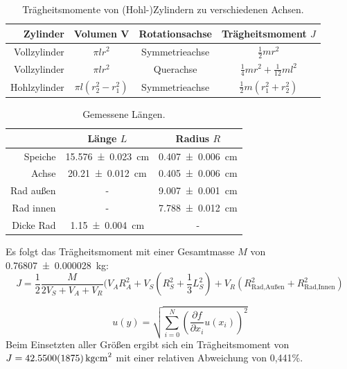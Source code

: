 \documentclass[
	a4paper,
	12pt,
	pagesize,
	ngerman
]{scrartcl}
\begin{document}
	\begin{table}[tb]
		\centering
		\begin{tabular}{ r |  c | c | c}
			Zylinder& Volumen V &Rotationsachse & Trägheitsmoment $J$\\ \hline
			Vollzylinder& $\pi lr^2$ &Symmetrieachse & $\frac{1}{2} m r^2$ \\
			Vollzylinder& $\pi lr^2$&Querachse & $\frac{1}{4} m r^2 + \frac{1}{12} m l^2$ \\
			Hohlzylinder& $\pi l(r_2^2 - r_1^2)$&Symmetrieachse & $\frac{1}{2} m (r_1^2 + r_2^2)$ \\
		\end{tabular}
		\caption{Trägheitsmomente von (Hohl-)Zylindern zu verschiedenen Achsen.}
		\label{Tabelle_Traegheitsmomente_Zylinder} 
	\end{table}

	\begin{table}[tb]
		\centering
		\begin{tabular}{ r |  c | c }
			& Länge $L$ & Radius $R$\\ \hline
			Speiche &\SI{15,576\pm 0,023}{cm} & \SI{0,407\pm0,006}{cm}\\
			Achse & \SI{20,21\pm0,012}{cm} & \SI{0,405\pm0,006}{cm}\\
			Rad außen&- & \SI{9,007\pm0,001}{cm} \\
			Rad innen&- & \SI{7,788\pm0,012}{cm} \\
			Dicke Rad & \SI{1,15\pm0,004}{cm} & -
		\end{tabular}
		\caption{ Gemessene Längen.}
		\label{Tabelle_Laenge} 
	\end{table}
	Es folgt das Trägheitsmoment mit einer Gesamtmasse $M$ von \SI{0,76807 \pm 0,000028}{kg}:
	\begin{equation}
		J = \frac{1}{2}\frac{M}{2V_S+V_A+V_R} ( V_A R_A^2 + V_S (R_S^2 + \frac{1}{3} L_S^2) + V_R (R_\text{Rad,Außen}^2 + R_\text{Rad,Innen}^2)
	\end{equation}

	\begin{equation}
		u(y) = \sqrt{  \sum_{i=0}^{N} \left( \frac{\partial f}{\partial x_i}u(x_i)\right)^2  }
		\label{Partielle_Unsicherheiten}
	\end{equation}
	Beim Einsetzten aller Größen ergibt sich ein Trägheitsmoment von $J = \SI{42.550 \pm 0,1875}{kg cm^2}$ mit einer relativen Abweichung von 0,441\%.
\end{document}
